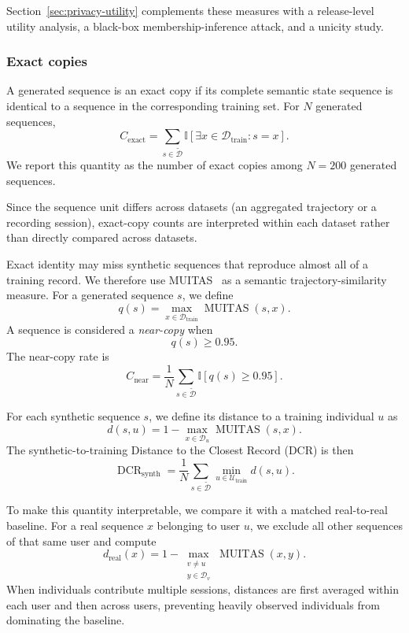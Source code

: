 \documentclass[sigconf,nonacm]{acmart}
\begin{document}
Section~\ref{sec:privacy-utility} complements these measures with a release-level utility analysis, a black-box membership-inference attack, and a unicity study.

\subsubsection{Exact copies}

A generated sequence is an exact copy if its complete semantic state sequence is identical to a sequence in the corresponding training set. For $N$ generated sequences,
%
\[
    C_{\mathrm{exact}}
    =
    \sum_{s\in\widetilde{\mathcal{D}}}
    \mathbb{I}
    \left[
        \exists x\in\mathcal{D}_{\mathrm{train}}:
        s=x
    \right].
\]
%
We report this quantity as the number of exact copies among $N=200$ generated sequences.

Since the sequence unit differs across datasets (an aggregated trajectory or a recording session), exact-copy counts are interpreted within each dataset rather than directly compared across datasets.

Exact identity may miss synthetic sequences that reproduce almost all of a training record. We therefore use MUITAS~\cite{petry2019} as a
semantic trajectory-similarity measure. For a generated sequence $s$, we define
%
\[
    q(s)
    =
    \max_{x\in\mathcal{D}_{\mathrm{train}}}
    \operatorname{MUITAS}(s,x).
\]
%
A sequence is considered a \textit{near-copy} when
%
\[
    q(s) \geq 0.95.
\]
%
The near-copy rate is
%
\[
    C_{\mathrm{near}}
    =
    \frac{1}{N}
    \sum_{s\in\widetilde{\mathcal{D}}}
    \mathbb{I}[q(s)\geq0.95].
\]

For each synthetic sequence $s$, we define its distance to a training individual $u$ as
%
\[
    d(s,u)
    =
    1 -
    \max_{x\in\mathcal{D}_u}
    \operatorname{MUITAS}(s,x).
\]
%
The synthetic-to-training Distance to the Closest Record (DCR) is then
%
\[
    \operatorname{DCR}_{\mathrm{synth}}
    =
    \frac{1}{N}
    \sum_{s\in\widetilde{\mathcal{D}}}
    \min_{u\in\mathcal{U}_{\mathrm{train}}}
    d(s,u).
\]

To make this quantity interpretable, we compare it with a matched
real-to-real baseline. For a real sequence $x$ belonging to user $u$, we exclude all other sequences of that same user and compute
%
\[
    d_{\mathrm{real}}(x)
    =
    1-
    \max_{\substack{
        v\neq u\\
        y\in\mathcal{D}_v
    }}
    \operatorname{MUITAS}(x,y).
\]
%
When individuals contribute multiple sessions, distances are first averaged within each user and then across users, preventing heavily observed individuals from dominating the baseline.
\end{document}
